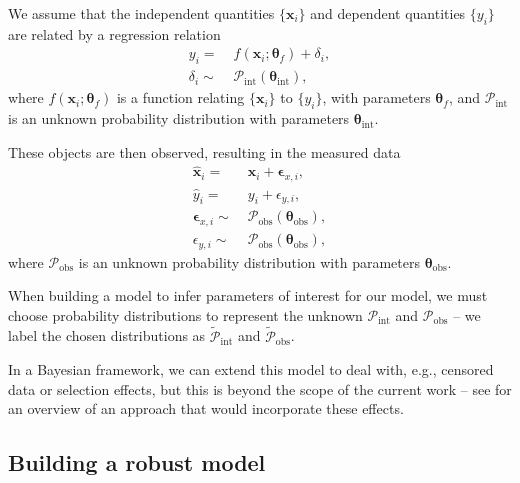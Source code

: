 \documentclass[fleqn,usenatbib]{rasti}
\begin{document}
We assume that the independent quantities $\{\boldsymbol{x}_i\}$ and dependent
quantities $\{y_i\}$ are related by a regression relation
\begin{align}
    y_i =&\; f(\boldsymbol{x}_i; \boldsymbol{\theta}_f) + \delta_i, \\
    \delta_i \sim&\; \mathcal{P}_{\text{int}} \left( \boldsymbol{\theta}_{\text{int}} \right),
\end{align}
where $f(\boldsymbol{x}_i; \boldsymbol{\theta}_f)$ is a function relating
$\{\boldsymbol{x}_i\}$ to $\{y_i\}$, with parameters $\boldsymbol{\theta}_f$,
and $\mathcal{P}_{\text{int}}$ is an unknown probability distribution with
parameters $\boldsymbol{\theta}_{\text{int}}$.

These objects are then observed, resulting in the measured
data
\begin{align}
    \hat{\boldsymbol{x}}_i =&\; \boldsymbol{x}_i + \boldsymbol{\epsilon}_{x,i}, \\
    \hat{y}_i =&\; y_i + \epsilon_{y,i}, \\
    \boldsymbol{\epsilon}_{x,i} \sim&\; \mathcal{P}_{\text{obs}} \left( \boldsymbol{\theta}_{\text{obs}} \right), \\
    \epsilon_{y,i} \sim&\; \mathcal{P}_{\text{obs}} \left( \boldsymbol{\theta}_{\text{obs}} \right),
\end{align}
where $\mathcal{P}_{\text{obs}}$ is an unknown probability distribution with
parameters $\boldsymbol{\theta}_{\text{obs}}$.

When building a model to infer parameters of interest for our model, we must
choose probability distributions to represent the unknown
$\mathcal{P}_{\text{int}}$ and $\mathcal{P}_{\text{obs}}$ -- we label the chosen
distributions as $\tilde{\mathcal{P}}_{\text{int}}$ and
$\tilde{\mathcal{P}}_{\text{obs}}$.

In a Bayesian framework, we can extend this model to deal with, e.g., censored
data or selection effects, but this is beyond the scope of the current work --
see \citet{Kelly:2007} for an overview of an approach that would incorporate
these effects.

\subsection{Building a robust model}
\label{sec:formalism.robust}
\end{document}
